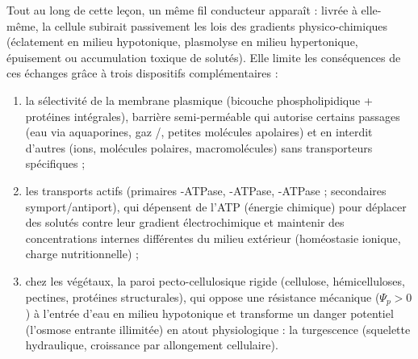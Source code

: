 \documentclass[11pt]{article}
\newcommand{\cle}[1]{{\popxbold\color{popdark}#1}}
\begin{document}
Tout au long de cette leçon, un même fil conducteur apparaît : livrée à elle-même, la cellule subirait passivement les lois des gradients physico-chimiques (éclatement en milieu hypotonique, plasmolyse en milieu hypertonique, épuisement ou accumulation toxique de solutés). Elle \cle{limite les conséquences} de ces échanges grâce à trois dispositifs complémentaires :
\begin{enumerate}
\item la \cle{sélectivité de la membrane plasmique} (bicouche phospholipidique + protéines intégrales), barrière semi-perméable qui autorise certains passages (eau via aquaporines, gaz /, petites molécules apolaires) et en interdit d'autres (ions, molécules polaires, macromolécules) sans transporteurs spécifiques ;
\item les \cle{transports actifs} (primaires -ATPase, -ATPase, -ATPase ; secondaires symport/antiport), qui dépensent de l'ATP (énergie chimique) pour déplacer des solutés contre leur gradient électrochimique et maintenir des concentrations internes différentes du milieu extérieur (homéostasie ionique, charge nutritionnelle) ;
\item chez les végétaux, la \cle{paroi pecto-cellulosique rigide} (cellulose, hémicelluloses, pectines, protéines structurales), qui oppose une résistance mécanique ($\Psi_p > 0$) à l'entrée d'eau en milieu hypotonique et transforme un danger potentiel (l'osmose entrante illimitée) en atout physiologique : la turgescence (squelette hydraulique, croissance par allongement cellulaire).
\end{enumerate}
\end{document}
